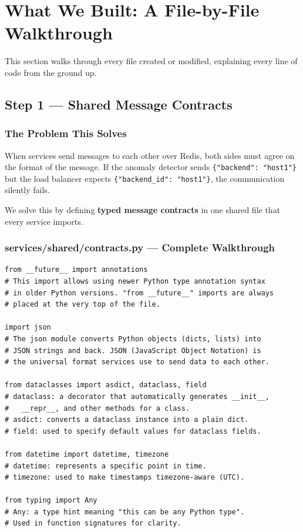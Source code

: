 \documentclass[12pt, a4paper]{article}
\begin{document}
\section{What We Built: A File-by-File Walkthrough}

This section walks through every file created or modified, explaining every
line of code from the ground up.

\subsection{Step 1 --- Shared Message Contracts}
\label{sec:contracts}

\subsubsection{The Problem This Solves}

When services send messages to each other over Redis, both sides must agree on
the format of the message. If the anomaly detector sends
\texttt{\{"backend": "host1"\}} but the load balancer expects
\texttt{\{"backend\_id": "host1"\}}, the communication silently fails.

We solve this by defining \textbf{typed message contracts} in one shared file
that every service imports.

\subsubsection{services/shared/contracts.py --- Complete Walkthrough}

\begin{lstlisting}[style=python, caption={services/shared/contracts.py}]
from __future__ import annotations
# This import allows using newer Python type annotation syntax
# in older Python versions. "from __future__" imports are always
# placed at the very top of the file.

import json
# The json module converts Python objects (dicts, lists) into
# JSON strings and back. JSON (JavaScript Object Notation) is
# the universal format services use to send data to each other.

from dataclasses import asdict, dataclass, field
# dataclass: a decorator that automatically generates __init__,
#   __repr__, and other methods for a class.
# asdict: converts a dataclass instance into a plain dict.
# field: used to specify default values for dataclass fields.

from datetime import datetime, timezone
# datetime: represents a specific point in time.
# timezone: used to make timestamps timezone-aware (UTC).

from typing import Any
# Any: a type hint meaning "this can be any Python type".
# Used in function signatures for clarity.
\end{lstlisting}
\end{document}

